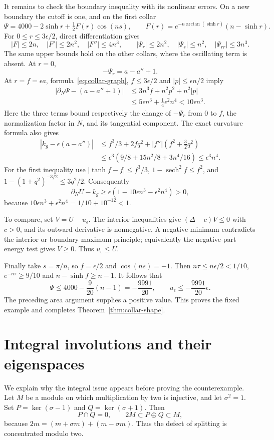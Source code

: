 \documentclass[11pt,a4paper]{article}
\theoremstyle{definition}
\begin{document}
It remains to check the boundary inequality with its nonlinear errors. On a new boundary the cutoff is one, and on the first collar
\[
 \Psi=4000-2\sinh r+\tfrac12F(r)\cos(ns),\qquad
 F(r)=e^{-n\arctan(\sinh r)}(n-\sinh r).
\]
For $0\le r\le3\epsilon/2$, direct differentiation gives
\[
 |F|\le2n,\quad |F'|\le2n^2,\quad |F''|\le4n^3,
 \qquad |\Psi_r|\le2n^2,\quad |\Psi_s|\le n^2,
 \quad |\Psi_{rr}|\le3n^3.
\]
The same upper bounds hold on the other collars, where the oscillating term is absent. At $r=0$,
\[
                         -\Psi_r=a-a''+1.
\]
At $r=f=\epsilon a$, formula~\eqref{eq:collar-graph}, $f\le3\epsilon/2$ and $|p|\le\epsilon n/2$ imply
\begin{align*}
 |\partial_N\Psi-(a-a''+1)|
 &\le3n^3f+n^2p^2+n^2|p|\\
 &\le5\epsilon n^3+\tfrac14\epsilon^2n^4
 <10\epsilon n^3.
\end{align*}
Here the three terms bound respectively the change of $-\Psi_r$ from $0$ to $f$, the normalization factor in $N$, and its tangential component. The exact curvature formula also gives
\begin{align*}
 |k_g-\epsilon(a-a'')|
 &\le f^3/3+2fq^2+|f''|(f^2+\tfrac32q^2)\\
 &\le\epsilon^3(9/8+15n^2/8+3n^4/16)
 \le\epsilon^3n^4.
\end{align*}
For the first inequality use $|\tanh f-f|\le f^3/3$, $1-\operatorname{sech}^2f\le f^2$, and $1-(1+q^2)^{-3/2}\le3q^2/2$. Consequently
\[
 \partial_NU-k_g\ge
 \epsilon(1-10\epsilon n^3-\epsilon^2n^4)>0,
\]
because $10\epsilon n^3+\epsilon^2n^4=1/10+10^{-12}<1$.

To compare, set $V=U-u_\epsilon$. The interior inequalities give $(\Delta-c)V\le0$ with $c>0$, and its outward derivative is nonnegative. A negative minimum contradicts the interior or boundary maximum principle; equivalently the negative-part energy test gives $V\ge0$. Thus $u_\epsilon\le U$.

Finally take $s=\pi/n$, so $f=\epsilon/2$ and $\cos(ns)=-1$. Then $n\tau\le n\epsilon/2<1/10$, $e^{-n\tau}\ge9/10$ and $n-\sinh f\ge n-1$. It follows that
\[
 \Psi\le4000-\frac9{20}(n-1)=-\frac{9991}{20},
 \qquad u_\epsilon\le-\frac{9991}{20}\epsilon.
\]
The preceding area argument supplies a positive value. This proves the fixed example and completes Theorem~\ref{thm:collar-shape}.

\section{Integral involutions and their eigenspaces}
We explain why the integral issue appears before proving the counterexample. Let $M$ be a module on which multiplication by two is injective, and let $\sigma^2=1$. Set $P=\ker(\sigma-1)$ and $Q=\ker(\sigma+1)$. Then
\[
 P\cap Q=0,\qquad 2M\subset P\oplus Q\subset M,
\]
because $2m=(m+\sigma m)+(m-\sigma m)$. Thus the defect of splitting is concentrated modulo two.
\end{document}

